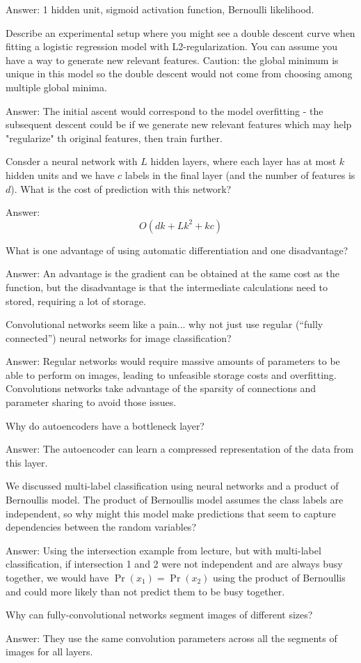 \documentclass{article}
\def\ans#1{\par\gre{Answer: #1}}
\def\gre#1{{\color{gre}#1}}
\begin{document}
{\ans{
1 hidden unit, sigmoid activation function, Bernoulli likelihood.
}
\item Describe an experimental setup where you might see a double descent curve when fitting a logistic regression model with L2-regularization. You can assume you have a way to generate new relevant features. Caution: the global minimum is unique in this model so the double descent would not come from choosing among multiple global minima.
\ans{
The initial ascent would correspond to the model overfitting - the subsequent descent could be if we generate new relevant features which may help "regularize" th original features, then train further.
}
\item Consder a neural network with $L$ hidden layers, where each layer has at most $k$ hidden units and we have $c$ labels in the final layer (and the number of features is $d$). What is the cost of prediction with this network?
\ans{
\[O(dk + Lk^2 + kc)\]
}
\item What is one advantage of using automatic differentiation and one disadvantage?
\ans{
An advantage is the gradient can be obtained at the same cost as the function, but the disadvantage is that the intermediate calculations need to stored, requiring a lot of storage.
}
\pagebreak 
\item Convolutional networks seem like a pain... why not just use regular (``fully connected'') neural networks for image classification?
\ans{
Regular networks would require massive amounts of parameters to be able to perform on images, leading to unfeasible storage costs and overfitting. Convolutions networks take advantage of the sparsity of connections and parameter sharing to avoid those issues.
}
\item Why do autoencoders have a bottleneck layer?
\ans{
The autoencoder can learn a compressed representation of the data from this layer.
}
\item We discussed multi-label classification using neural networks and a product of Bernoullis model. The product of Bernoullis model assumes the class labels are independent, so why might this model make predictions that seem to capture dependencies between the random variables?
\ans{
Using the intersection example from lecture, but with multi-label classification, if intersection 1 and 2 were not independent and are always busy together, we would have $\Pr(x_1)=\Pr(x_2)$ using the product of Bernoullis and could more likely than not predict them to be busy together.
}
\item Why can fully-convolutional networks segment images of different sizes?
\ans{
They use the same convolution parameters across all the segments of images for all layers.
}
}


 
\end{document}
